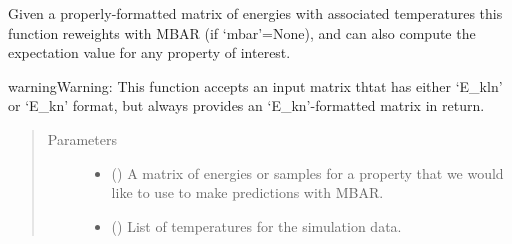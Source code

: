\documentclass[letterpaper,12pt,english,openany,oneside]{sphinxmanual}
\begin{document}
\begin{fulllineitems}
\label{\detokenize{thermo:parameters.reweight.get_mbar_expectation}}
Given a properly-formatted matrix of energies with associated temperatures this function reweights with MBAR (if ‘mbar’=None), and can also compute the expectation value for any property of interest.

\begin{sphinxadmonition}{warning}{Warning:}
This function accepts an input matrix thtat has either ‘E\_kln’ or ‘E\_kn’ format, but always provides an ‘E\_kn’-formatted matrix in return.
\end{sphinxadmonition}
\begin{quote}\begin{description}
\item[{Parameters}] \leavevmode\begin{itemize}
\item {} 
 (\sphinxstyleliteralemphasis{\sphinxupquote{( }}\sphinxstyleliteralemphasis{\sphinxupquote{( }}\sphinxstyleliteralemphasis{\sphinxupquote{ ) }}\sphinxstyleliteralemphasis{\sphinxupquote{ ) }}\sphinxstyleliteralemphasis{\sphinxupquote{( }}\sphinxstyleliteralemphasis{\sphinxupquote{( }}\sphinxstyleliteralemphasis{\sphinxupquote{( }}\sphinxstyleliteralemphasis{\sphinxupquote{ ) }}\sphinxstyleliteralemphasis{\sphinxupquote{ ) }}\sphinxstyleliteralemphasis{\sphinxupquote{ )}}) \textendash{} A matrix of energies or samples for a property that we would like to use to make predictions with MBAR.

\item {} 
 (\sphinxstyleliteralemphasis{\sphinxupquote{( }}\sphinxstyleliteralemphasis{\sphinxupquote{ )}}) \textendash{} List of temperatures for the simulation data.


\end{itemize}
\end{description}
\end{quote}
\end{fulllineitems}
\end{document}
